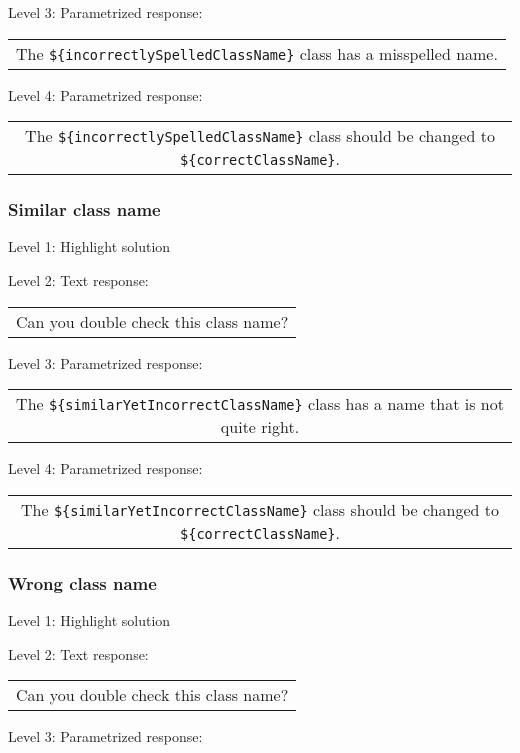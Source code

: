 \noindent Level 3: Parametrized response: \medskip

\begin{tabular}{|c}
The \verb|${incorrectlySpelledClassName}| class has a misspelled name.
\end{tabular} \medskip

\noindent Level 4: Parametrized response: \medskip

\begin{tabular}{|c}
The \verb|${incorrectlySpelledClassName}| class should be changed to \verb|${correctClassName}|.
\end{tabular} \medskip


\subsubsection{Similar class name}

\noindent Level 1: Highlight solution \medskip

\noindent Level 2: Text response: \medskip

\begin{tabular}{|c}
Can you double check this class name?
\end{tabular} \medskip

\noindent Level 3: Parametrized response: \medskip

\begin{tabular}{|c}
The \verb|${similarYetIncorrectClassName}| class has a name that is not quite right.
\end{tabular} \medskip

\noindent Level 4: Parametrized response: \medskip

\begin{tabular}{|c}
The \verb|${similarYetIncorrectClassName}| class should be changed to \verb|${correctClassName}|.
\end{tabular} \medskip


\subsubsection{Wrong class name}

\noindent Level 1: Highlight solution \medskip

\noindent Level 2: Text response: \medskip

\begin{tabular}{|c}
Can you double check this class name?
\end{tabular} \medskip

\noindent Level 3: Parametrized response: \medskip

